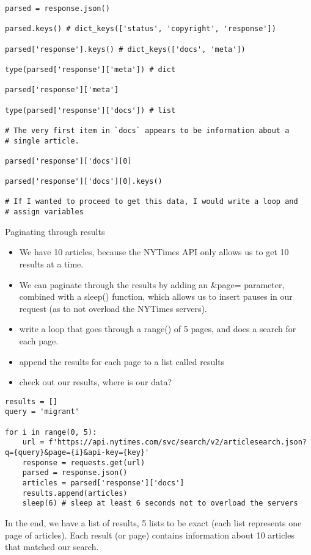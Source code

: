 \documentclass[11pt]{article}
\begin{document}
\begin{verbatim}
parsed = response.json()

parsed.keys() # dict_keys(['status', 'copyright', 'response'])

parsed['response'].keys() # dict_keys(['docs', 'meta'])

type(parsed['response']['meta']) # dict

parsed['response']['meta']

type(parsed['response']['docs']) # list

# The very first item in `docs` appears to be information about a
# single article.

parsed['response']['docs'][0]

parsed['response']['docs'][0].keys()

# If I wanted to proceed to get this data, I would write a loop and
# assign variables
\end{verbatim}

Paginating through results
\begin{itemize}
\item We have 10 articles, because the NYTimes API only allows us to get
10 results at a time.
\item We can paginate through the results by adding an \&page= parameter,
combined with a sleep() function, which allows us to insert pauses
in our request (as to not overload the NYTimes servers).
\item write a loop that goes through a range() of 5 pages, and does a
search for each page.
\item append the results for each page to a list called results
\item check out our results, where is our data?
\end{itemize}

\begin{verbatim}
results = []
query = 'migrant'

for i in range(0, 5):  
    url = f'https://api.nytimes.com/svc/search/v2/articlesearch.json?q={query}&page={i}&api-key={key}'
    response = requests.get(url)
    parsed = response.json()
    articles = parsed['response']['docs']
    results.append(articles)
    sleep(6) # sleep at least 6 seconds not to overload the servers
\end{verbatim}

In the end, we have a list of results, 5 lists to be exact (each list
represents one page of articles). Each result (or page) contains
information about 10 articles that matched our search.
\end{document}
